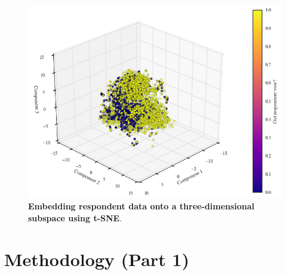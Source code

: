 \documentclass{article}
\begin{document}
	\begin{figure}[h!]
		\begin{center}
			\includegraphics*[width=0.45\linewidth]{tsne}
			\caption{\textbf{Embedding respondent data onto a three-dimensional subspace using t-SNE}.}
			\label{fig:tsne}
		\end{center}
	\end{figure}

	\section{Methodology (Part 1)}
\end{document}
